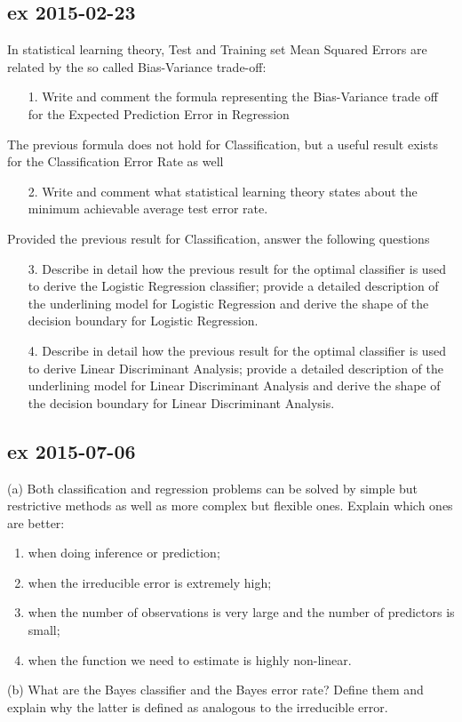 \documentclass[a4paper,12pt,titlepage]{article} %
\begin{document}
\subsection{ex 2015-02-23}
In statistical learning theory, Test and Training set Mean Squared Errors are related by the so called Bias-Variance trade-off:
\begin{itemize}
\item[1.] Write and comment the formula representing the Bias-Variance trade off for the Expected Prediction Error in Regression
\end{itemize}

The previous formula does not hold for Classification, but a useful result exists for the Classification Error Rate as well

\begin{itemize}
\item[2.] Write and comment what statistical learning theory states about the minimum achievable average test error rate.
\end{itemize}

Provided the previous result for Classification, answer the following questions

\begin{itemize}
\item[3.] Describe in detail how the previous result for the optimal classifier is used to derive the Logistic Regression classifier; provide a detailed description of the underlining model for Logistic Regression and derive the shape of the decision boundary for Logistic Regression.
\item[4.] Describe in detail how the previous result for the optimal classifier is used to derive Linear Discriminant Analysis; provide a detailed description of the underlining model for Linear Discriminant Analysis and derive the shape of the decision boundary for Linear Discriminant Analysis.
\end{itemize}

\subsection{ex 2015-07-06}
(a) Both classification and regression problems can be solved by simple but restrictive methods as well as more complex but flexible ones. Explain which ones are better:
\begin{enumerate}
\item when doing inference or prediction;
\item when the irreducible error is extremely high;
\item when the number of observations is very large and the number of predictors is small;
\item when the function we need to estimate is highly non-linear.
\end{enumerate}
(b) What are the Bayes classifier and the Bayes error rate? Define them and explain why the latter is defined as analogous to the irreducible error.
\end{document}
